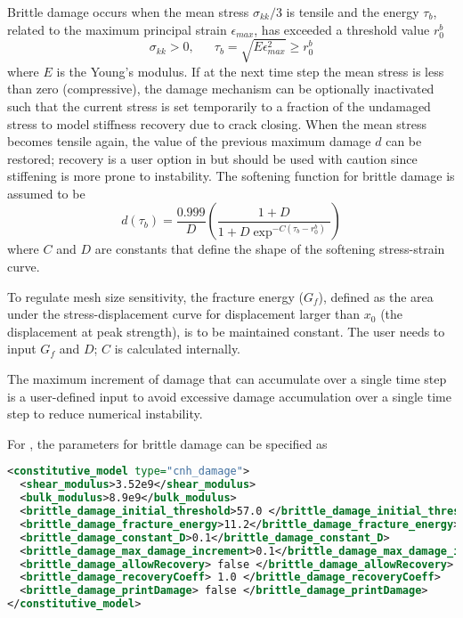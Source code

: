 Brittle damage occurs when the mean stress $\sigma_{kk}/3$ is tensile
and the energy $\tau_b$, related to the maximum principal 
strain $\epsilon_{max}$, has exceeded a threshold value $r_0^b$
\begin{equation}
  \sigma_{kk}>0, \phantom{ijkl}
  \tau_b = \sqrt{E \epsilon_{max}^2} \geq r_0^b
\end{equation}
where $E$ is the Young's modulus. If at the next time step the mean stress is less than
zero (compressive), the damage mechanism can be optionally inactivated such that the current stress 
is set temporarily to a fraction of the undamaged stress to 
model stiffness recovery due to crack closing. When the mean stress becomes tensile again,
the value of the previous maximum damage $d$ can be restored; recovery is a user option in \Vaango
but should be used with caution since stiffening is more prone to instability.
The softening function for brittle damage is assumed to be
\begin{equation}
  d(\tau_b)= \frac{0.999}{D} \left(\frac{1+D}{1+D \exp^{-C(\tau_b-r_0^b)}} \right)
\end{equation}
where $C$ and $D$ are constants that define the shape of the softening
stress-strain curve.
  
To regulate mesh size sensitivity, the fracture energy
($G_f$), defined as the area under the stress-displacement
curve for displacement larger than $x_0$ (the displacement at peak strength), is to be 
maintained constant.
The user needs to input $G_f$ and $D$; $C$ is calculated internally. 

The maximum increment of damage that can accumulate over a single time
step is a user-defined input to avoid excessive damage accumulation over
a single time step to reduce numerical instability.

For , the parameters for brittle damage can be specified as
\begin{lstlisting}[language=XML]
<constitutive_model type="cnh_damage">
  <shear_modulus>3.52e9</shear_modulus>
  <bulk_modulus>8.9e9</bulk_modulus>
  <brittle_damage_initial_threshold>57.0 </brittle_damage_initial_threshold>
  <brittle_damage_fracture_energy>11.2</brittle_damage_fracture_energy>
  <brittle_damage_constant_D>0.1</brittle_damage_constant_D>
  <brittle_damage_max_damage_increment>0.1</brittle_damage_max_damage_increment>
  <brittle_damage_allowRecovery> false </brittle_damage_allowRecovery>
  <brittle_damage_recoveryCoeff> 1.0 </brittle_damage_recoveryCoeff>
  <brittle_damage_printDamage> false </brittle_damage_printDamage>
</constitutive_model>
\end{lstlisting}

